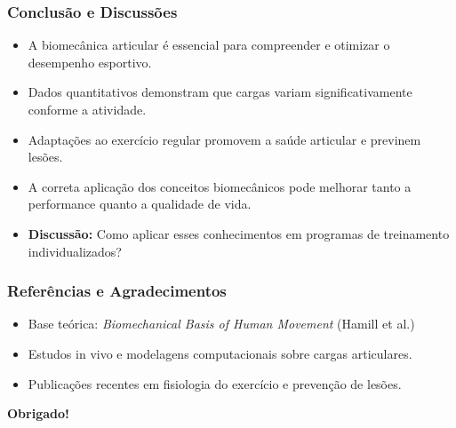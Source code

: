 \documentclass{beamer}
\begin{document}
\begin{frame}
\frametitle{Conclusão e Discussões}
\begin{itemize}
    \item A biomecânica articular é essencial para compreender e otimizar o desempenho esportivo.
    \item Dados quantitativos demonstram que cargas variam significativamente conforme a atividade.
    \item Adaptações ao exercício regular promovem a saúde articular e previnem lesões.
    \item A correta aplicação dos conceitos biomecânicos pode melhorar tanto a performance quanto a qualidade de vida.
    \item \textbf{Discussão:} Como aplicar esses conhecimentos em programas de treinamento individualizados?
\end{itemize}
\end{frame}

\begin{frame}
\frametitle{Referências e Agradecimentos}
\begin{itemize}
    \item Base teórica: \emph{Biomechanical Basis of Human Movement} (Hamill et al.)
    \item Estudos in vivo e modelagens computacionais sobre cargas articulares.
    \item Publicações recentes em fisiologia do exercício e prevenção de lesões.
\end{itemize}
\vspace{0.3cm}
\centering
\textbf{Obrigado!}
\end{frame}
\end{document}

